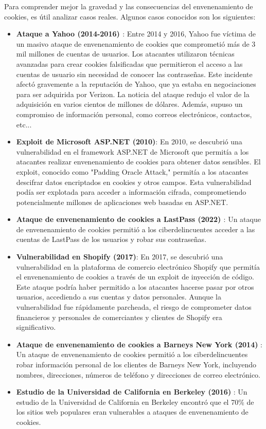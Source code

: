 Para comprender mejor la gravedad y las consecuencias del envenenamiento de cookies, es útil analizar casos reales. Algunos casos conocidos son los siguientes:

\begin{itemize}
    \item \textbf{Ataque a Yahoo (2014-2016) \cite{bbc2016noticias}}: Entre 2014 y 2016, Yahoo fue víctima de un masivo ataque de envenenamiento de cookies que comprometió más de 3 mil millones de cuentas de usuarios. Los atacantes utilizaron técnicas avanzadas para crear cookies falsificadas que permitieron el acceso a las cuentas de usuario sin necesidad de conocer las contraseñas. Este incidente afectó gravemente a la reputación de Yahoo, que ya estaba en negociaciones para ser adquirida por Verizon. La noticia del ataque redujo el valor de la adquisición en varios cientos de millones de dólares. Además, supuso un compromiso de información personal, como correos electrónicos, contactos, etc...

    \item \textbf{Exploit de Microsoft ASP.NET (2010)}: En 2010, se descubrió una vulnerabilidad en el framework ASP.NET de Microsoft que permitía a los atacantes realizar envenenamiento de cookies para obtener datos sensibles. El exploit, conocido como "Padding Oracle Attack," permitía a los atacantes descifrar datos encriptados en cookies y otros campos. Esta vulnerabilidad podía ser explotada para acceder a información cifrada, comprometiendo potencialmente millones de aplicaciones web basadas en ASP.NET.

    \item \textbf{Ataque de envenenamiento de cookies a LastPass (2022) \cite{unaaldia2022lastpass}} : Un ataque de envenenamiento de cookies permitió a los ciberdelincuentes acceder a las cuentas de LastPass de los usuarios y robar sus contraseñas.

    \item \textbf{Vulnerabilidad en Shopify (2017)}: En 2017, se descubrió una vulnerabilidad en la plataforma de comercio electrónico Shopify que permitía el envenenamiento de cookies a través de un exploit de inyección de código. Este ataque podría haber permitido a los atacantes hacerse pasar por otros usuarios, accediendo a sus cuentas y datos personales. Aunque la vulnerabilidad fue rápidamente parcheada, el riesgo de comprometer datos financieros y personales de comerciantes y clientes de Shopify era significativo.

    \item \textbf{Ataque de envenenamiento de cookies a Barneys New York (2014)} : Un ataque de envenenamiento de cookies permitió a los ciberdelincuentes robar información personal de los clientes de Barneys New York, incluyendo nombres, direcciones, números de teléfono y direcciones de correo electrónico.

    \item \textbf{Estudio de la Universidad de California en Berkeley (2016)} : Un estudio de la Universidad de California en Berkeley encontró que el 70\% de los sitios web populares eran vulnerables a ataques de envenenamiento de cookies.
\end{itemize}

